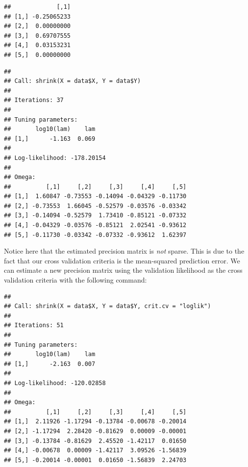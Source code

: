\documentclass[11pt,]{report}
\newenvironment{Shaded}{\begin{snugshade}}{\end{snugshade}}
\newcommand{\CommentTok}[1]{\textcolor[rgb]{0.56,0.35,0.01}{\textit{#1}}}
\newcommand{\DataTypeTok}[1]{\textcolor[rgb]{0.13,0.29,0.53}{#1}}
\newcommand{\KeywordTok}[1]{\textcolor[rgb]{0.13,0.29,0.53}{\textbf{#1}}}
\newcommand{\NormalTok}[1]{#1}
\newcommand{\OperatorTok}[1]{\textcolor[rgb]{0.81,0.36,0.00}{\textbf{#1}}}
\newcommand{\StringTok}[1]{\textcolor[rgb]{0.31,0.60,0.02}{#1}}
\begin{document}
\begin{verbatim}
##             [,1]
## [1,] -0.25065233
## [2,]  0.00000000
## [3,]  0.69707555
## [4,]  0.03153231
## [5,]  0.00000000
\end{verbatim}

\vspace{0.5cm}

\begin{Shaded}
\end{Shaded}

\begin{verbatim}
## 
## Call: shrink(X = data$X, Y = data$Y)
## 
## Iterations: 37
## 
## Tuning parameters:
##       log10(lam)    lam
## [1,]      -1.163  0.069
## 
## Log-likelihood: -178.20154
## 
## Omega:
##          [,1]     [,2]     [,3]     [,4]     [,5]
## [1,]  1.60847 -0.73553 -0.14094 -0.04329 -0.11730
## [2,] -0.73553  1.66045 -0.52579 -0.03576 -0.03342
## [3,] -0.14094 -0.52579  1.73410 -0.85121 -0.07332
## [4,] -0.04329 -0.03576 -0.85121  2.02541 -0.93612
## [5,] -0.11730 -0.03342 -0.07332 -0.93612  1.62397
\end{verbatim}

\vspace{0.5cm}

Notice here that the estimated precision matrix is \emph{not} sparse. This is due to the fact that our cross validation criteria is the mean-squared prediction error. We can estimate a new precision matrix using the validation likelihood as the cross validation criteria with the following command:

\vspace{0.5cm}

\begin{Shaded}
\end{Shaded}

\begin{verbatim}
## 
## Call: shrink(X = data$X, Y = data$Y, crit.cv = "loglik")
## 
## Iterations: 51
## 
## Tuning parameters:
##       log10(lam)    lam
## [1,]      -2.163  0.007
## 
## Log-likelihood: -120.02858
## 
## Omega:
##          [,1]     [,2]     [,3]     [,4]     [,5]
## [1,]  2.11926 -1.17294 -0.13784 -0.00678 -0.20014
## [2,] -1.17294  2.28420 -0.81629  0.00009 -0.00001
## [3,] -0.13784 -0.81629  2.45520 -1.42117  0.01650
## [4,] -0.00678  0.00009 -1.42117  3.09526 -1.56839
## [5,] -0.20014 -0.00001  0.01650 -1.56839  2.24703
\end{verbatim}
\end{document}
